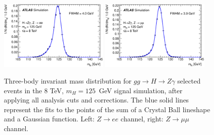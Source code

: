 \begin{figure}[!htbp]
  \begin{center}
{\includegraphics[width=0.48\textwidth]{figures/PlotsSuperposedResolutionCorrections_e_mc12a_Mllg}}
{\includegraphics[width=0.48\textwidth]{figures/PlotsSuperposedResolutionCorrections_mu_mc12a_Mllg}}
\caption{Three-body invariant mass distribution for $gg\to H\to Z\gamma$
    selected events in the 8 TeV, $m_H=125$~GeV signal simulation, 
    after applying all analysis cuts and corrections. The blue solid lines 
    represent the fits to the points of the sum of a 
    Crystal Ball lineshape and a Gaussian function.
    Left: $Z\to ee$ channel, right: $Z\to\mu\mu$ channel.}
  \label{fig:signal_resolution_corrections}
  \end{center}
\end{figure}

